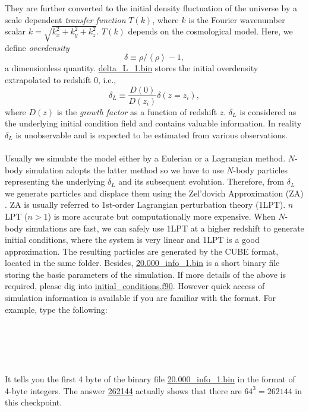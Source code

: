 \documentclass[12pt]{article}
\begin{document}
They are further converted to the initial density fluctuation of the universe by a scale dependent {\it transfer function} $T(k)$, where $k$ is the Fourier wavenumber scalar $k=\sqrt{k_x^2+k_y^2+k_z^2}$. $T(k)$ depends on the cosmological model. Here, we define {\it overdensity}
\begin{equation}
	\delta\equiv\rho/\left\langle\rho\right\rangle-1,
\end{equation}
a dimensionless quantity. \url{delta_L_1.bin} stores the initial overdensity extrapolated to redshift 0, i.e.,
\begin{equation}
	\delta_L\equiv \frac{D(0)}{D(z_i)} \delta(z=z_i),
\end{equation}
where $D(z)$ is the {\it growth factor} as a function of redshift $z$. $\delta_L$ is considered as the underlying initial condition field and contains valuable information. In reality $\delta_L$ is unobservable and is expected to be estimated from various observations.
\\\\
Usually we simulate the model either by a Eulerian or a Lagrangian method. $N$-body simulation adopts the latter method so we have to use $N$-body particles representing the underlying $\delta_L$ and its subsequent evolution. Therefore, from $\delta_L$ we generate particles and displace them using the Zel'dovich Approximation (ZA) \cite{1970A&A.....5...84Z}. ZA is usually referred to 1st-order Lagrangian perturbation theory (1LPT). $n$LPT ($n>1$) is more accurate but computationally more expensive. When $N$-body simulations are fast, we can safely use 1LPT at a higher redshift to generate initial conditions, where the system is very linear and 1LPT is a good approximation. The resulting particles are generated by the CUBE format, located in the same folder. Besides, \url{20.000_info_1.bin} is a short binary file storing the basic parameters of the simulation. If more details of the above is required, please dig into \url{initial_conditions.f90}. However quick access of simulation information is available if you are familiar with the format. For example, type the following:
\\\\
\\
\\
\\
\\
It tells you the first 4 byte of the binary file \url{20.000_info_1.bin} in the format of 4-byte integers. The answer \url{262144} actually shows that there are $64^3=262144$ in this checkpoint.
\end{document}
